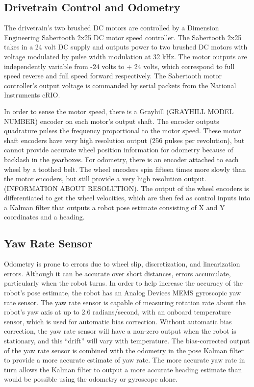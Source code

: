 \documentclass{article}
\begin{document}
\subsection[Drivetrain Control and Odometry]{Drivetrain Control and Odometry}
The drivetrain{\textquoteright}s two brushed DC motors are controlled by a Dimension Engineering Sabertooth 2x25 DC motor speed controller. The Sabertooth 2x25 takes in a 24 volt DC supply and outputs power to two brushed DC motors with voltage modulated by pulse width modulation at 32 kHz. The motor outputs are independently variable from -24 volts to + 24 volts, which correspond to full speed reverse and full speed forward respectively. The Sabertooth motor controller{\textquoteright}s output voltage is commanded by serial packets from the National Instruments cRIO.

In order to sense the motor speed, there is a Grayhill (GRAYHILL MODEL NUMBER) encoder on each motor{\textquoteright}s output shaft. The encoder outputs quadrature pulses the frequency proportional to the motor speed. These motor shaft encoders have very high resolution output (256 pulses per revolution), but cannot provide accurate wheel position information for odometry because of backlash in the gearboxes. For odometry, there is an encoder attached to each wheel by a toothed belt. The wheel encoders spin fifteen times more slowly than the motor encoders, but still provide a very high resolution output. (INFORMATION ABOUT RESOLUTION). The output of the wheel encoders is differentiated to get the wheel velocities, which are then fed as control inputs into a Kalman filter that outputs a robot pose estimate consisting of X and Y coordinates and a heading.

\subsection[Yaw Rate Sensor]{Yaw Rate Sensor}
Odometry is prone to errors due to wheel slip, discretization, and linearization errors. Although it can be accurate over short distances, errors accumulate, particularly when the robot turns. In order to help increase the accuracy of the robot{\textquoteright}s pose estimate, the robot has an Analog Devices MEMS gyroscopic yaw rate sensor. The yaw rate sensor is capable of measuring rotation rate about the robot{\textquoteright}s yaw axis at up to 2.6 radians/second, with an onboard temperature sensor, which is used for automatic bias correction. Without automatic bias correction, the yaw rate sensor will have a non-zero output when the robot is stationary, and this {\textquotedblleft}drift{\textquotedblright} will vary with temperature. The bias-corrected output of the yaw rate sensor is combined with the odometry in the pose Kalman filter to provide a more accurate estimate of yaw rate. The more accurate yaw rate in turn allows the Kalman filter to output a more accurate heading estimate than would be possible using the odometry or gyroscope alone.
\end{document}
